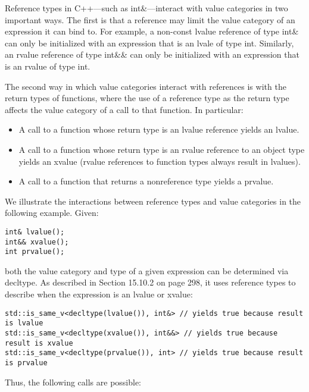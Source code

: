 Reference types in C++—such as int\&—interact with value categories in two important ways. The first is that a reference may limit the value category of an expression it can bind to. For example, a non-const lvalue reference of type int\& can only be initialized with an expression that is an lvale of type int. Similarly, an rvalue reference of type int\&\& can only be initialized with an expression that is an rvalue of type int.

The second way in which value categories interact with references is with the return types of functions, where the use of a reference type as the return type affects the value category of a call to that function. In particular:

\begin{itemize}
\item 
A call to a function whose return type is an lvalue reference yields an lvalue.

\item 
A call to a function whose return type is an rvalue reference to an object type yields an xvalue (rvalue references to function types always result in lvalues).

\item 
A call to a function that returns a nonreference type yields a prvalue.
\end{itemize}

We illustrate the interactions between reference types and value categories in the following example. Given:

\begin{lstlisting}[style=styleCXX]
int& lvalue();
int&& xvalue();
int prvalue();
\end{lstlisting}

both the value category and type of a given expression can be determined via decltype. As described in Section 15.10.2 on page 298, it uses reference types to describe when the expression is an lvalue or xvalue:

\begin{lstlisting}[style=styleCXX]
std::is_same_v<decltype(lvalue()), int&> // yields true because result is lvalue
std::is_same_v<decltype(xvalue()), int&&> // yields true because result is xvalue
std::is_same_v<decltype(prvalue()), int> // yields true because result is prvalue
\end{lstlisting}

Thus, the following calls are possible:


